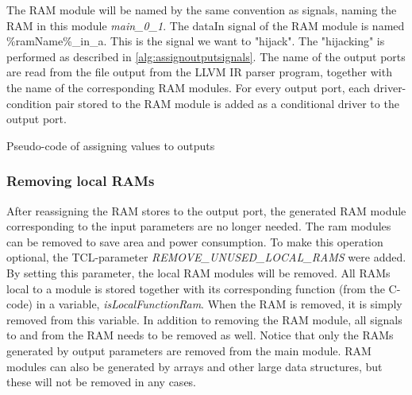 The RAM module will be named by the same convention as signals, naming the RAM in this module \textit{main\_0\_1}. The dataIn signal of the RAM module is named \%ramName\%\_in\_a. This is the signal we want to "hijack". The "hijacking" is performed as described in \cref{alg:assignoutputsignals}. The name of the output ports are read from the file output from the LLVM IR parser program, together with the name of the corresponding RAM modules. For every output port, each driver-condition pair stored to the RAM module is added as a conditional driver to the output port.
\makeatletter
\let\OldStatex\Statex
\renewcommand{\Statex}[1][3]{%
  \setlength\@tempdima{\algorithmicindent}%
  \OldStatex\hskip\dimexpr#1\@tempdima\relax}
\makeatother
\begin{algorithm}
  \caption{Pseudo-code of assigning values to outputs
  \label{alg:assignoutputsignals}}
\end{algorithm}

\subsubsection{Removing local RAMs}
After reassigning the RAM stores to the output port, the generated RAM module corresponding to the input parameters are no longer needed. The ram modules can be removed to save area and power consumption. To make this operation optional, the TCL-parameter \textit{REMOVE\_UNUSED\_LOCAL\_RAMS} were added. By setting this parameter, the local RAM modules will be removed. All RAMs local to a module is stored together with its corresponding function (from the C-code) in a variable, \textit{	isLocalFunctionRam}. When the RAM is removed, it is simply removed from this variable. In addition to removing the RAM module, all signals to and from the RAM needs to be removed as well. Notice that only the RAMs generated by output parameters are removed from the main module. RAM modules can also be generated by arrays and other large data structures, but these will not be removed in any cases.

